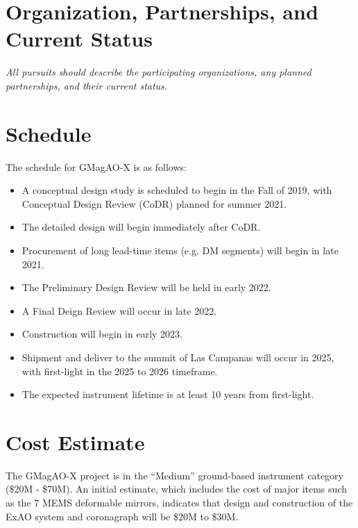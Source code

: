 \documentclass[12pt,preprint]{aastex}
\begin{document}
\section{Organization, Partnerships, and Current Status}  
\textit{All pursuits should describe the participating
organizations, any planned partnerships, and their current status.}

\section{Schedule}
The schedule for GMagAO-X is as follows:
\vspace{-10pt}
\begin{itemize} \itemsep 0pt
\item A conceptual design study is scheduled to begin in the Fall of 2019, with Conceptual Design Review (CoDR) planned for summer 2021.  
\item The detailed design will begin immediately after CoDR.
\item Procurement of long lead-time items (e.g. DM segments) will begin in late 2021.  
\item The Preliminary Design Review will be held in early 2022.
\item A Final Deign Review will occur in late 2022.
\item Construction will begin in early 2023.
\item Shipment and deliver to the summit of Las Campanas will occur in 2025, with first-light in the 2025 to 2026 timeframe.
\item The expected instrument lifetime is at least 10 years from first-light.  
\end{itemize}

\section{Cost Estimate}

The GMagAO-X project is in the ``Medium'' ground-based instrument category (\$20M - \$70M).  An initial estimate, which includes the cost of major items such as the 7 MEMS deformable mirrors, indicates that design and construction of the ExAO system and coronagraph will be \$20M to \$30M.   



\clearpage
\thispagestyle{empty}
\end{document}
